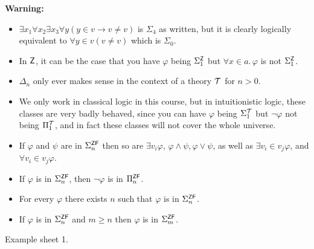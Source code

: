 \documentclass{article}
\begin{document}
\newlec
\textbf{Warning:} \begin{itemize}
    \item $\exists x_{1} \forall x_{2} \exists x_{3} \forall y ( y \in v \rightarrow v \neq v)$ is $\Sigma_{4}$ as written, but it is clearly logically equivalent to $\forall y \in v (v \neq v)$ which is $\Sigma_{0}$.
    \item In $\mathsf{Z}$, it can be the case that you have $\varphi$ being $\Sigma_{1}^{\mathsf{Z}}$ but $\forall x \in a.\, \varphi$ is not $\Sigma_{1}^{\mathsf{Z}}$.
    \item $\Delta_{n}$ only ever makes sense in the context of a theory $\mathcal{T}$ for $n>0$.
    \item We only work in classical logic in this course, but in intuitionistic logic, these classes are very badly behaved, since you can have $\varphi$ being $\Sigma_{1}^{\mathcal{T}}$ but $\neg \varphi$ not being $\Pi_{1}^{\mathcal{T}}$, and in fact these classes will not cover the whole universe.
\end{itemize}
\begin{fancylem}{}\hspace{0.1cm}

    \begin{itemize}
        \item If $\varphi$ and $\psi$ are in $\Sigma_{n}^{\mathsf{ZF}}$ then so are $\exists v_{i} \varphi,\, \varphi \wedge \psi, \varphi \vee \psi$, as well as $\exists v_{i} \in v_{j} \varphi$, and $\forall v_{i} \in v_{j} \varphi$.
        \item If $\varphi$ is in $\Sigma_{n}^{\mathsf{ZF}}$, then $\neg \varphi$ is in $\Pi_{n}^{\mathsf{ZF}}$.
        \item For every $\varphi$ there exists $n$ such that $\varphi$ is in $\Sigma_{n}^{\mathsf{ZF}}$.
        \item If $\varphi$ is in $\Sigma_{n}^{\mathsf{ZF}}$ and $m \geq n$ then $\varphi$ is in $\Sigma_{m}^{\mathsf{ZF}}$.
    \end{itemize}
\end{fancylem}
\proof Example sheet 1. \endproof
\end{document}
